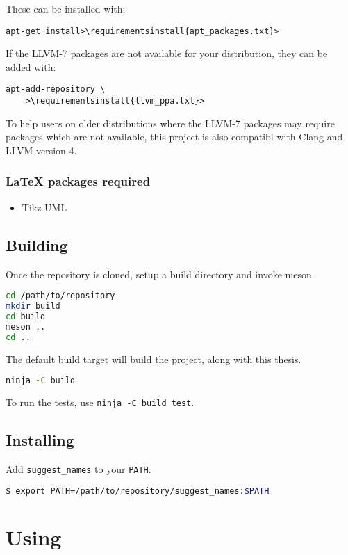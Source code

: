 These can be installed with:
\begin{lstlisting}[caption={Installing apt requirements}, escapechar=>,
		breaklines=true]
apt-get install>\requirementsinstall{apt_packages.txt}>
\end{lstlisting}
If the LLVM-7 packages are not available for your distribution, they can be
added with:
\begin{lstlisting}[caption={Adding the LLVM apt repository}, escapechar=>]
apt-add-repository \
	>\requirementsinstall{llvm_ppa.txt}>
\end{lstlisting}

To help users on older distributions where the LLVM-7 packages may require
packages which are not available, this project is also compatibl with Clang and
LLVM version 4.

\subsubsection{\LaTeX{} packages required}
\begin{itemize}
	\item Tikz-UML \cite{tikzuml}
\end{itemize}

\subsection{Building}
Once the repository is cloned, setup a build directory and invoke meson.
\begin{lstlisting}[language=bash]
cd /path/to/repository
mkdir build
cd build
meson ..
cd ..
\end{lstlisting}

The default build target will build the project, along with this thesis.
\begin{lstlisting}[language=bash]
ninja -C build
\end{lstlisting}

To run the tests, use \lstinline|ninja -C build test|.

\subsection{Installing}
Add \lstinline|suggest_names| to your \lstinline|PATH|.
\begin{lstlisting}[language=bash]
$ export PATH=/path/to/repository/suggest_names:$PATH
\end{lstlisting}


\section{Using}
